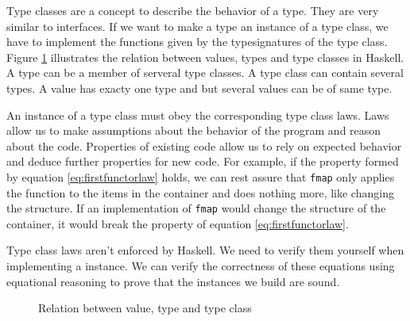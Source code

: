 Type classes are a concept to describe the behavior of a type. 
They are very similar to interfaces. If we want to make a type an instance of a type class, we have to implement the functions given by the \glspl{typesignature} of the type class. Figure \ref{fig:typeclassrelation} illustrates the relation between values, types and type classes in Haskell. A type can be a member of serveral type classes. A type class can contain several types. A value has exacty one type and but several values can be of same type.

An instance of a type class must obey the corresponding type class laws. Laws allow us to make assumptions about the behavior of the program and reason about the code. Properties of existing code allow us to rely on expected behavior and deduce further properties for new code. For example, if the property formed by equation \ref{eq:firstfunctorlaw} holds, we can rest assure that \verb|fmap| only applies the function to the items in the container and does nothing more, like changing the structure. If an implementation of \verb|fmap| would change the structure of the container, it would break the property of equation \ref{eq:firstfunctorlaw}.

Type class laws aren't enforced by Haskell. We need to verify them yourself when implementing a instance. We can verify the correctness of these equations using equational reasoning to prove that the instances we build are sound. 


\begin{figure}
\centering
{}
\caption{Relation between value, type and type class}
\label{fig:typeclassrelation}
\end{figure}
